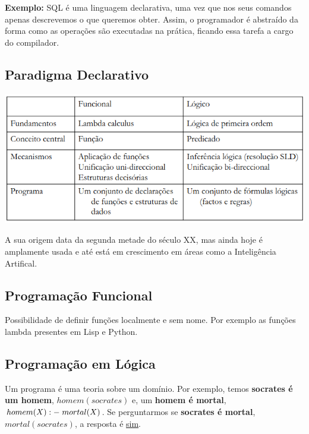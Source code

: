 \documentclass{article}
\begin{document}
\begin{flushleft}
\textbf{Exemplo:} SQL é uma linguagem declarativa, uma vez que nos seus comandos apenas descrevemos o que queremos obter.
Assim, o programador é abstraído da forma como as operações são executadas na prática, ficando essa tarefa a cargo
do compilador.
\end{flushleft}

\subsection{Paradigma Declarativo}

\begin{center}
\includegraphics[scale=0.5]{1}
\end{center}

A sua origem data da segunda metade do século XX, mas ainda hoje é amplamente usada e
até está em crescimento em áreas como a Inteligência Artifical.

\pagebreak

\subsection{Programação Funcional}

Possibilidade de definir funções localmente e sem nome. Por exemplo as
funções lambda presentes em Lisp e Python.

\subsection{Programação em Lógica}

Um programa é uma teoria sobre um domínio. Por exemplo, temos
\textbf{socrates é um homem}, $homem(socrates)$ e, um \textbf{homem é mortal}, $homem(X) :- \hspace{1mm} mortal(X)$.
Se perguntarmos se \textbf{socrates é mortal}, $mortal(socrates)$, a resposta é \uline{sim}.
\end{document}
